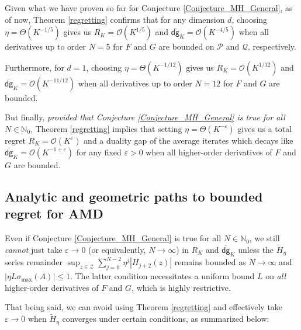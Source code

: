 \documentclass[11pt]{article}
\renewcommand{\P}{\mathcal{P}}
\newcommand{\Z}{\mathcal{Z}}
\newcommand{\N}{\mathbb{N}}
\newcommand{\Q}{\mathcal{Q}}
\newcommand{\dg}{\textsf{dg}}
\begin{document}
Given what we have proven so far for Conjecture \ref{Conjecture_MH_General}, as of now, Theorem \ref{regretting} confirms that for any dimension $d$, choosing $\eta=\Theta\left(K^{-1/5}\right)$ gives us $R_{K}=\mathcal{O}\left(K^{1/5}\right)$ and $\overline{\dg}_{K}=\mathcal{O}\left(K^{-4/5}\right)$ when all derivatives up to order $N=5$ for $F$ and $G$ are bounded on $\P$ and $\Q$, respectively. 

Furthermore, for $d=1$, choosing $\eta=\Theta\left(K^{-1/12}\right)$ gives us $R_{K}=\mathcal{O}\left(K^{1/12}\right)$ and $\overline{\dg}_{K}=\mathcal{O}\left(K^{-11/12}\right)$ when all derivatives up to order $N=12$ for $F$ and $G$ are bounded. 

But finally, \textit{provided that Conjecture \ref{Conjecture_MH_General} is true for all $N\in\N_{0}$}, Theorem \ref{regretting} implies that setting $\eta=\Theta\left(K^{-\varepsilon}\right)$ gives us a total regret $R_{K}=\mathcal{O}\left(K^{\varepsilon}\right)$ and a duality gap of the average iterates which decays like $\overline{\dg}_{K}=\mathcal{O}\left(K^{-1+\varepsilon}\right)$ for any fixed $\varepsilon>0$ when all higher-order derivatives of $F$ and $G$ are bounded. 

\subsection{Analytic and geometric paths to bounded regret for AMD}

Even if Conjecture \ref{Conjecture_MH_General} is true for all $N\in\N_{0}$, we still \textit{cannot} just take $\varepsilon\rightarrow 0$ (or equivalently, $N\rightarrow\infty$) in $R_{K}$ and $\overline{\dg}_{K}$ unless the $\widetilde{H}_{\eta}$ series remainder $\sup_{z\in\Z}\sum_{j=0}^{N-2}{\eta^{j}\left|H_{j+2}(z)\right|}$ remains bounded as $N\rightarrow\infty$ and $\left|\eta L\sigma_{\max}\left(A\right)\right|\leq 1$. The latter condition necessitates a uniform bound $L$ on \textit{all} higher-order derivatives of $F$ and $G$, which is highly restrictive. 

That being said, we can avoid using Theorem \ref{regretting} and effectively take $\varepsilon\rightarrow 0$ when $\widetilde{H}_{\eta}$ converges under certain conditions, as summarized below:
\end{document}
